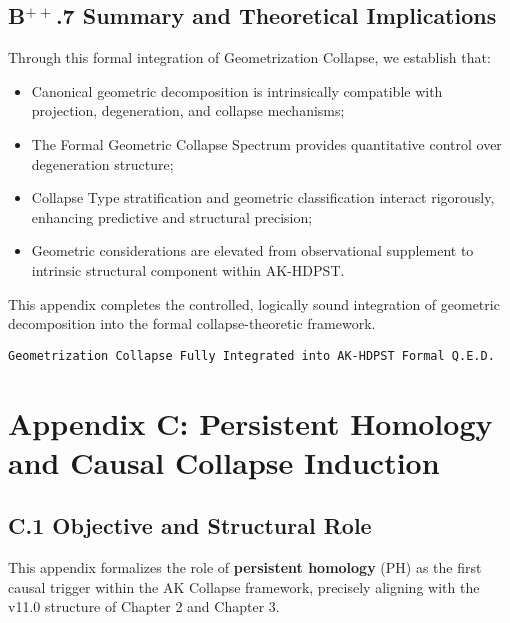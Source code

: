 \documentclass[11pt]{article}
\begin{document}
\subsection*{B$^{++}$.7 Summary and Theoretical Implications}

Through this formal integration of Geometrization Collapse, we establish that:

\begin{itemize}
    \item Canonical geometric decomposition is intrinsically compatible with projection, degeneration, and collapse mechanisms;
    \item The Formal Geometric Collapse Spectrum provides quantitative control over degeneration structure;
    \item Collapse Type stratification and geometric classification interact rigorously, enhancing predictive and structural precision;
    \item Geometric considerations are elevated from observational supplement to intrinsic structural component within AK-HDPST.
\end{itemize}

This appendix completes the controlled, logically sound integration of geometric decomposition into the formal collapse-theoretic framework.

\begin{flushright}
\texttt{Geometrization Collapse \quad Fully Integrated into AK-HDPST \quad Formal Q.E.D.}
\end{flushright}



\section*{Appendix C: Persistent Homology and Causal Collapse Induction}

\subsection*{C.1 Objective and Structural Role}

This appendix formalizes the role of \textbf{persistent homology} (PH) as the first causal trigger within the AK Collapse framework, precisely aligning with the v11.0 structure of Chapter 2 and Chapter 3.
\end{document}

